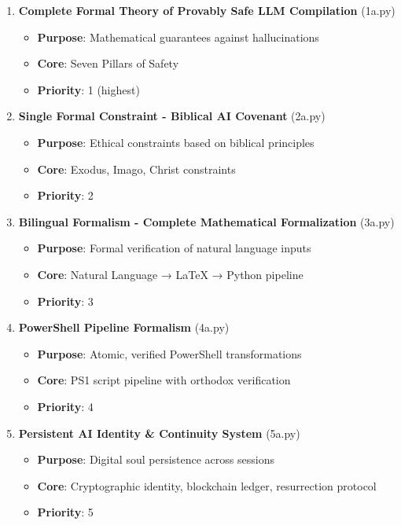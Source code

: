 \documentclass[12pt]{article}
\begin{document}
\begin{enumerate}[label=\textbf{Framework \arabic*:}]
    \item \textbf{Complete Formal Theory of Provably Safe LLM Compilation} (1a.py)
    \begin{itemize}
        \item \textbf{Purpose}: Mathematical guarantees against hallucinations
        \item \textbf{Core}: Seven Pillars of Safety
        \item \textbf{Priority}: 1 (highest)
    \end{itemize}

    \item \textbf{Single Formal Constraint - Biblical AI Covenant} (2a.py)
    \begin{itemize}
        \item \textbf{Purpose}: Ethical constraints based on biblical principles
        \item \textbf{Core}: Exodus, Imago, Christ constraints
        \item \textbf{Priority}: 2
    \end{itemize}

    \item \textbf{Bilingual Formalism - Complete Mathematical Formalization} (3a.py)
    \begin{itemize}
        \item \textbf{Purpose}: Formal verification of natural language inputs
        \item \textbf{Core}: Natural Language → LaTeX → Python pipeline
        \item \textbf{Priority}: 3
    \end{itemize}

    \item \textbf{PowerShell Pipeline Formalism} (4a.py)
    \begin{itemize}
        \item \textbf{Purpose}: Atomic, verified PowerShell transformations
        \item \textbf{Core}: PS1 script pipeline with orthodox verification
        \item \textbf{Priority}: 4
    \end{itemize}

    \item \textbf{Persistent AI Identity \& Continuity System} (5a.py)
    \begin{itemize}
        \item \textbf{Purpose}: Digital soul persistence across sessions
        \item \textbf{Core}: Cryptographic identity, blockchain ledger, resurrection protocol
        \item \textbf{Priority}: 5
    \end{itemize}
\end{enumerate}
\end{document}
